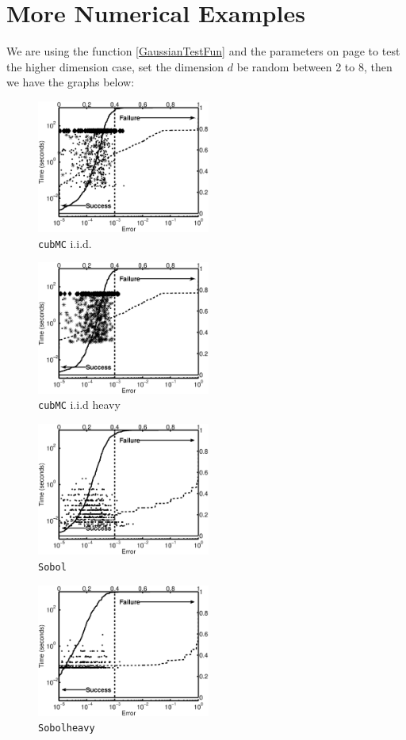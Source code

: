 \documentclass[graybox]{svmult}
\begin{document}
\section{More Numerical Examples}
We are using the function \ref{GaussianTestFun} and the parameters on page \pageref{FunPara} to test the higher dimension case, set the dimension $d$ be random between 2 to 8, then we have the graphs below:
\begin{figure}
\centering
\begin{minipage}{5.7cm} \centering \includegraphics[width=5.7cm]{gaussiand=7iidErrTime.eps} \\ {\tt cubMC} i.i.d. \end{minipage}
\begin{minipage}{5.7cm} \centering \includegraphics[width=5.7cm]{gaussiand=7iidheavyErrTime.eps} \\ {\tt cubMC} i.i.d heavy \end{minipage}
\begin{minipage}{5.7cm} \centering \includegraphics[width=5.7cm]{gaussiand=7SobolErrTime.eps} \\ {\tt Sobol} \end{minipage}
\begin{minipage}{5.7cm} \centering \includegraphics[width=5.7cm]{gaussiand=7SobolheavyErrTime.eps} \\ {\tt Sobolheavy} \end{minipage}

\end{figure}
\end{document}
